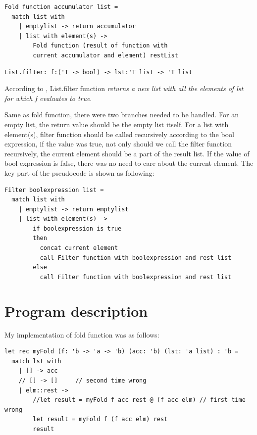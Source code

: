 \documentclass{article}
\begin{document}
\begin{lstlisting}
Fold function accumulator list =
  match list with
    | emptylist -> return accumulator
    | list with element(s) -> 
        Fold function (result of function with 
        current accumulator and element) restList
\end{lstlisting}


\begin{lstlisting}
List.filter: f:('T -> bool) -> lst:'T list -> 'T list
\end{lstlisting}

According to \cite{sporring2019}, List.filter function \emph{returns a new list with all the elements of lst for which f evaluates to true}. 

Same as fold function, there were two branches needed to be handled. For an empty list, the return value should be the empty list itself. For a list with element(s), filter function should be called recursively according to the bool expression, if the value was true, not only should we call the filter function recursively, the current element should be a part of the result list. If the value of bool expression is false, there was no need to care about the current element. The key part of the pseudocode is shown as following:

\begin{lstlisting}
Filter boolexpression list =
  match list with
    | emptylist -> return emptylist
    | list with element(s) -> 
        if boolexpression is true
        then
          concat current element 
          call Filter function with boolexpression and rest list
        else
          call Filter function with boolexpression and rest list  

\end{lstlisting}

\section{Program description}

My implementation of fold function was as follows:

\begin{lstlisting}
let rec myFold (f: 'b -> 'a -> 'b) (acc: 'b) (lst: 'a list) : 'b =
  match lst with
    | [] -> acc
    // [] -> []		// second time wrong
    | elm::rest -> 
        //let result = myFold f acc rest @ (f acc elm) // first time wrong
        let result = myFold f (f acc elm) rest
        result
\end{lstlisting}
\end{document}
